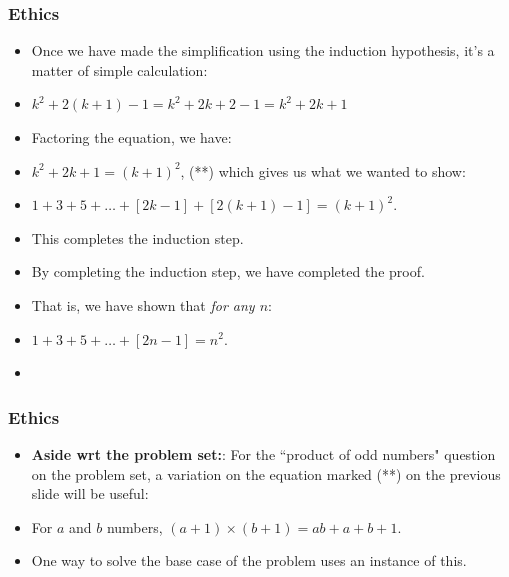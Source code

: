 \begin{frame}
\frametitle{Ethics}

\begin{itemize}[<+->]
\item 

Once we have made the simplification using the induction hypothesis, it's a matter of simple calculation:

\item $k^2 + 2(k+1) - 1 = k^2 + 2k+2 - 1 =  k^2 + 2k+ 1$

\item Factoring the equation, we have:

\item $k^2 + 2k+ 1 = (k + 1)^2$, (**) which gives us what we wanted to show:

\item  $1+3+5+ \ldots + [2k - 1] + [2(k+1) - 1] = (k+1)^2$.

\item This completes the induction step.

\item By completing the induction step, we have completed the proof. 
\item That is, we have shown that {\it{for any $n$}}:

\item    $1+3+5+ \ldots + [2n - 1] = n^2$.

\item 
\end{itemize} 
\end{frame}


\begin{frame}
\frametitle{Ethics}

\begin{itemize}[<+->]
\item 
{\bf{Aside wrt the problem set:}}: For the ``product of odd numbers" question on the problem set, a variation on the equation marked (**) on the previous slide will be useful:

\item For $a$ and $b$ numbers, $(a+1)\times(b+1) = ab + a + b + 1$. 

\item One way to solve the base case of the problem uses an instance of this.


\end{itemize} 
\end{frame}

\fi 


